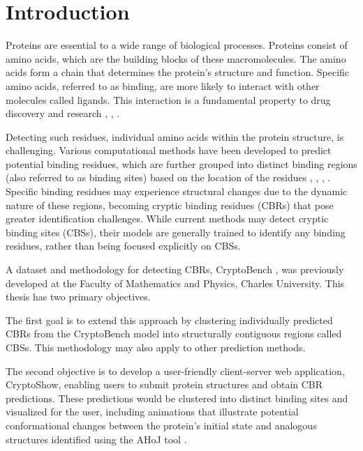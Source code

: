 \chapter*{Introduction}

Proteins are essential to a wide range of biological processes. Proteins consist of amino acids, which are the building blocks of these macromolecules. The amino acids form a chain that determines the protein's structure and function. Specific amino acids, referred to as binding, are more likely to interact with other molecules called ligands. This interaction is a fundamental property to drug discovery and research \cite{trainor2007importance}, \cite{ballante2021protein}, \cite{mannhold2006protein}.

Detecting such residues, individual amino acids within the protein structure, is challenging. Various computational methods have been developed to predict potential binding residues, which are further grouped into distinct binding regions (also referred to as binding sites) based on the location of the residues \cite{krivak2018p2rank}, \cite{le2009fpocket}, \cite{aggarwal2021deeppocket}, \cite{smith2024graph}. Specific binding residues may experience structural changes due to the dynamic nature of these regions, becoming cryptic binding residues (CBRs) that pose greater identification challenges. While current methods may detect cryptic binding sites (CBSs), their models are generally trained to identify any binding residues, rather than being focused explicitly on CBSs.

A dataset and methodology for detecting CBRs, CryptoBench \cite{vskrhak2025cryptobench}, was previously developed at the Faculty of Mathematics and Physics, Charles University. This thesis has two primary objectives.

The first goal is to extend this approach by clustering individually predicted CBRs from the CryptoBench model into structurally contiguous regions called CBSs. This methodology may also apply to other prediction methods.

The second objective is to develop a user-friendly client-server web application, CryptoShow, enabling users to submit protein structures and obtain CBR predictions. These predictions would be clustered into distinct binding sites and visualized for the user, including animations that illustrate potential conformational changes between the protein's initial state and analogous structures identified using the AHoJ tool \cite{feidakis2022ahoj}.

